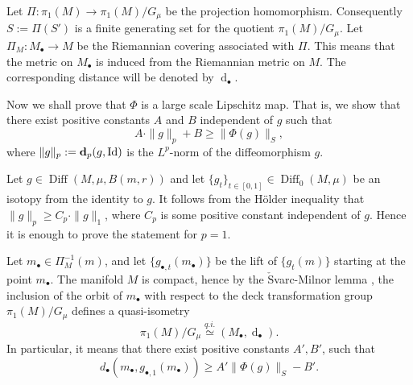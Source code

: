 \documentclass[a4paper,12pt]{amsart}
\def\Diff{\operatorname{Diff}}
\theoremstyle{definition}
\def\OP{\operatorname}
\begin{document}
Let $\Pi:\pi_1(M)\to\pi_1(M)/G_\mu$ be the projection homomorphism.
Consequently $S:=\Pi(S')$ is a finite generating set for the quotient
$\pi_1(M)/G_{\mu}$.  Let $\Pi_M\colon {M}_{\bullet}\to M$ be the
Riemannian covering associated with $\Pi$. This means that the metric
on $M_{\bullet}$ is induced from the Riemannian metric on $M$. The
corresponding distance will be denoted by $\OP{d}_{\bullet}$.

Now we shall prove that $\Phi$ is a large scale Lipschitz map.
That is, we show that there exist positive constants $A$ and $B$
independent of $g$ such that
$$
A\cdot \|g\|_p+B\geq\|\Phi(g)\|_S,
$$
where $\|g\|_p:={\bf d}_p(g,\OP{Id})$ is the $L^p$-norm
of the diffeomorphism $g$.

Let $g\in \Diff(M,\mu,B(m,r))$ and let $\{g_t\}_{t\in [0,1]}\in \Diff_0(M,\mu)$
be an isotopy from the identity to $g$. It follows from the H\"older
inequality that $\|g\|_p\geq C_p\cdot \|g\|_1$,
where $C_p$ is some positive constant independent of $g$. Hence it is
enough to prove the statement for $p=1$.

Let ${m}_{\bullet}\in \Pi_M^{-1}(m)$, and
let $\{g_{\bullet,t}(m_{\bullet})\}$ be the lift of
$\{g_t(m)\}$ starting at the point $m_{\bullet}$.
The manifold $M$ is compact, hence by the $\check{\textrm{S}}$varc-Milnor
lemma \cite{BH,Mil}, the inclusion of the orbit of $m_{\bullet}$
with respect to the deck transformation group $\pi_1(M)/G_{\mu}$ defines
a quasi-isometry
\begin{equation*}
\pi_1(M)/G_{\mu} \stackrel{q.i.}\simeq ({M}_{\bullet},\OP{d}_{\bullet}).
\end{equation*}
In particular, it means that there exist positive constants $A',B'$, such that
\begin{equation}\label{eq:q-i-Milnor}
{d}_{\bullet}({m}_{\bullet},{g}_{\bullet,1}({m}_{\bullet}))\geq A'\|\Phi(g)\|_S-B'.
\end{equation}
\end{document}
